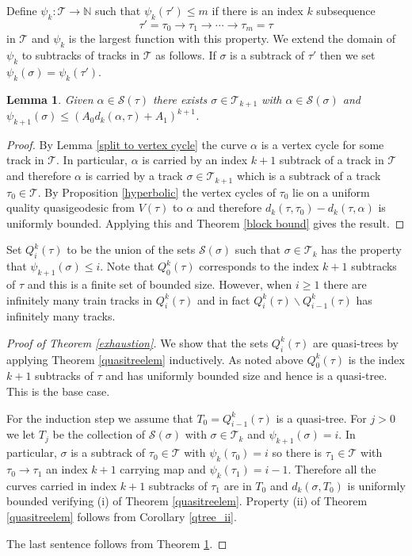 \documentclass[11pt]{article}
\newtheorem{lemma}[thm]{Lemma}
\theoremstyle{remark}
\def\N{{\mathbb N}}
\def\S{{\mathcal S}}
\def\T{{\mathcal T}}
\begin{document}
Define $\psi_k\colon \T \to \N$ such that $\psi_k(\tau') \le m$ if there is an index $k$ subsequence
$$\tau'=\tau_0 \to \tau_1 \to \cdots \to\tau_m = \tau$$
in $\T$ and $\psi_k$ is the largest function with this property. We extend the domain
of $\psi_k$ to subtracks of tracks in $\T$ as follows.
If $\sigma$ is a subtrack of $\tau'$ then we set $\psi_k(\sigma) = \psi_k(\tau')$.

\begin{lemma}\label{large distance}
Given $\alpha\in \S(\tau)$ there exists $\sigma \in \T_{k+1}$ with $\alpha \in \S(\sigma)$ and $\psi_{k+1}(\sigma) \le (A_0 d_k(\alpha, \tau) + A_1)^{k+1}$.
\end{lemma}

\begin{proof}
By Lemma \ref{split to vertex cycle} the curve $\alpha$ is a vertex cycle for some track in $\T$.
In particular, $\alpha$ is carried by an index $k+1$ subtrack of a track in $\T$ and therefore $\alpha$ is carried by a track $\sigma \in \T_{k+1}$ which is a subtrack of a track $\tau_0 \in \T$.
By Proposition \ref{hyperbolic} the vertex cycles of $\tau_0$ lie on a uniform quality quasigeodesic from $V(\tau)$ to $\alpha$ and therefore $d_k(\tau, \tau_0) - d_k(\tau, \alpha)$ is uniformly bounded. Applying this and Theorem \ref{block bound} gives the result.
\end{proof}

Set $Q^k_i(\tau)$ to be the union of the sets  $\S(\sigma)$ such that $\sigma \in \T_k$ has the property that $\psi_{k+1}(\sigma) \le i$.
Note that $Q^k_0(\tau)$ corresponds to the index $k+1$ subtracks of $\tau$ and this is a finite set of bounded size. However, when $i \ge 1$ there are infinitely many train tracks in $Q^k_i(\tau)$ and in fact $Q^k_i(\tau) \smallsetminus Q^{k}_{i-1}(\tau)$ has infinitely many tracks.


\begin{proof}[Proof of Theorem \ref{exhaustion}]
We show that the sets $Q^k_i(\tau)$ are quasi-trees by applying Theorem \ref{quasitreelem} inductively. As noted above $Q^{k}_0(\tau)$ is the index $k+1$ subtracks of $\tau$ and has uniformly bounded size and hence is a quasi-tree. This is the base case.

For the induction step we assume that $T_0 = Q_{i-1}^{k}(\tau)$ is a
quasi-tree. For $j>0$ we let $T_j$ be the collection of $\S(\sigma)$
with $\sigma \in \T_k$ and $\psi_{k+1}(\sigma) = i$. In particular, $\sigma$ is a subtrack of $\tau_0 \in \T$ with $\psi_k(\tau_0)  = i$ so there is $\tau_1 \in \T$ with $\tau_0 \to \tau_1$ an index $k+1$ carrying map and $\psi_k(\tau_1) = i-1$. Therefore all the curves carried in index $k+1$ subtracks of $\tau_1$ are in $T_0$ and $d_k(\sigma, T_0)$ is uniformly bounded verifying (i) of Theorem \ref{quasitreelem}. Property (ii) of Theorem \ref{quasitreelem} follows from Corollary \ref{qtree_ii}.

 The last sentence follows from Theorem \ref{large distance}.
\end{proof}
\end{document}
